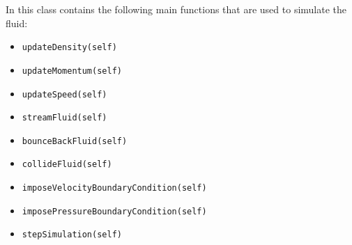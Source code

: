 In this class contains the following main functions that are used to simulate the fluid:
\begin{itemize}[noitemsep]
	\item \texttt{updateDensity(self)}
	\item \texttt{updateMomentum(self)}
	\item \texttt{updateSpeed(self)}
	\item \texttt{streamFluid(self)}
	\item \texttt{bounceBackFluid(self)}
	\item \texttt{collideFluid(self)}
	\item \texttt{imposeVelocityBoundaryCondition(self)}
	\item \texttt{imposePressureBoundaryCondition(self)}
	\item \texttt{stepSimulation(self)}
\end{itemize}
